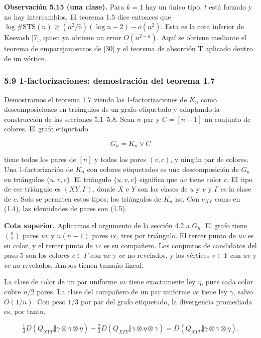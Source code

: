 \documentclass[spanish,11pt,a4paper]{article}
\begin{document}
\textbf{Observación 5.15 (una clase).} Para \(k=1\) hay un único tipo, \(t\) está forzado y no hay intercambios. El teorema 1.5 dice entonces que \(\log\#\mathrm{STS}(n)\ge(n^2/6)(\log n-2)-o(n^2)\). Esta es la cota inferior de Keevash {[}7{]}, quien ya obtiene un error \(O(n^{2-a})\). Aquí se obtiene mediante el teorema de emparejamientos de {[}30{]} y el teorema de absorción T aplicado dentro de un vórtice.

\subsubsection{5.9 1-factorizaciones: demostración del teorema 1.7}\label{factorizaciones-demostraciuxf3n-del-teorema-1.7}

Demostramos el teorema 1.7 viendo las 1-factorizaciones de \(K_n\) como descomposiciones en triángulos de un grafo etiquetado y adaptando la construcción de las secciones 5.1--5.8. Sean \(n\) par y \(C=[n-1]\) un conjunto de colores. El grafo etiquetado

\nopagebreak[4]
\[G_n=K_n\vee C\]

tiene todos los pares de \([n]\) y todos los pares \((v,c)\), y ningún par de colores. Una 1-factorización de \(K_n\) con colores etiquetados es una descomposición de \(G_n\) en triángulos \(\{u,v,c\}\). El triángulo \(\{u,v,c\}\) significa que \(uv\) tiene color \(c\). El tipo de ese triángulo es \((XY,\Gamma)\), donde \(X\) e \(Y\) son las clases de \(u\) y \(v\) y \(\Gamma\) es la clase de \(c\). Solo se permiten estos tipos; los triángulos de \(K_n\) no. Con \(e_{XY}\) como en (1.4), las identidades de pares son (1.5).

\textbf{Cota superior.} Aplicamos el argumento de la sección 4.2 a \(G_n\). El grafo tiene \(\binom{n}{2}\) pares \(uv\) y \(n(n-1)\) pares \(vc\), tres por triángulo. El tercer punto de \(uv\) es su color, y el tercer punto de \(vc\) es su compañero. Los conjuntos de candidatos del paso 5 son los colores \(c\in\Gamma\) con \(uc\) y \(vc\) no revelados, y los vértices \(v\in Y\) con \(uv\) y \(vc\) no revelados. Ambos tienen tamaño lineal.

La clase de color de un par uniforme \(uv\) tiene exactamente ley \(\eta\), pues cada color cubre \(n/2\) pares. La clase del compañero de un par uniforme \(vc\) tiene ley \(\gamma\), salvo \(O(1/n)\). Con peso \(1/3\) por par del grafo etiquetado, la divergencia promediada es, por tanto,

\nopagebreak[4]
\[\tfrac13D(Q_{XY\Gamma}\Vert\gamma\otimes\gamma\otimes\eta)+\tfrac23D(Q_{X\Gamma Y}\Vert\gamma\otimes\eta\otimes\gamma)=D(Q_{XY\Gamma}\Vert\gamma\otimes\gamma\otimes\eta).\]
\end{document}
